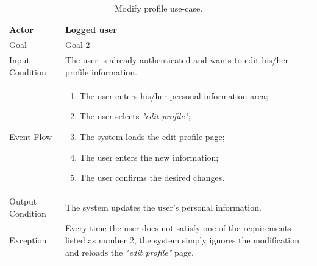 \begin{table}[H]
\begin{center}
\begin{tabular}{p{} | p{}}
\hline
Actor & Logged user\\
\hline
Goal & Goal 2\\
\hline
Input Condition & The user is already authenticated and wants to edit his/her profile information.\\
\hline
Event Flow & 
\begin{enumerate}
\item The user enters his/her personal information area;
\item The user selects \emph{"edit profile"};
\item The system loads the edit profile page;
\item The user enters the new information;
\item The user confirms the desired changes.
\end{enumerate} \\
\hline
Output Condition & The system updates the user's personal information.\\
\hline
Exception & Every time the user does not satisfy one of the requirements listed as number 2, the system simply ignores the modification and reloads the \emph{"edit profile"} page.\\
\hline
\end{tabular}
\end{center}
\caption{Modify profile use-case.}
\label{modify_profile_uc}
\end{table}

